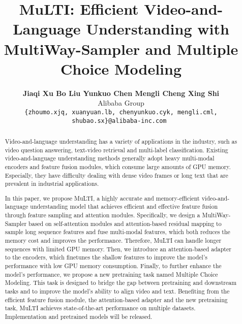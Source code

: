 \documentclass[10pt,twocolumn,letterpaper]{article}
\begin{document}
\title{MuLTI: Efficient Video-and-Language Understanding with MultiWay-Sampler and Multiple Choice Modeling}



\author{\textbf{Jiaqi Xu \hspace{3mm} Bo Liu\hspace{3mm} Yunkuo Chen \hspace{3mm} Mengli Cheng \hspace{3mm} Xing Shi}\\
Alibaba Group\\
{
    \tt\small \{zhoumo.xjq, xuanyuan.lb, chenyunkuo.cyk, mengli.cml, shubao.sx\}@alibaba-inc.com 
}
}

\maketitle
\ificcvfinal\thispagestyle{empty}\fi

\begin{abstract}

Video-and-language understanding has a variety of applications in the industry, such as video question answering, text-video retrieval and multi-label classification.
Existing video-and-language understanding methods generally adopt heavy multi-modal encoders and feature fusion modules, which consume large amounts of GPU memory. 
Especially, they have difficulty dealing with dense video frames or long text that are prevalent in industrial applications. 


In this paper, we propose MuLTI, a highly accurate and memory-efficient video-and-language understanding model that achieves efficient and effective feature fusion through feature sampling and attention modules.
Specifically, we design a MultiWay-Sampler based on self-attention modules and attention-based residual mapping to sample long sequence features and fuse multi-modal features, which both reduces the memory cost and improves the performance.
Therefore, MuLTI can handle longer sequences with limited GPU memory.
Then, we introduce an attention-based adapter to the encoders, which finetunes the shallow features to improve the model's performance with low GPU memory consumption.
Finally, to further enhance the model's performance, we propose a new pretraining task named Multiple Choice Modeling. This task is designed to bridge the gap between pretraining and downstream tasks and to improve the model's ability to align video and text.
Benefiting from the efficient feature fusion module, the attention-based adapter and the new pretraining task, MuLTI achieves state-of-the-art performance on multiple datasets.
Implementation and pretrained models will be released.
\end{abstract} \vspace{-4ex}
\end{document}
